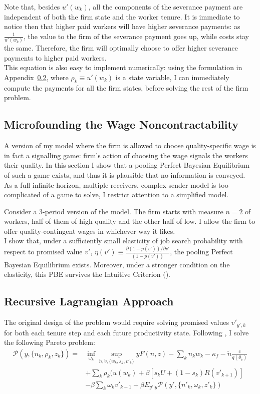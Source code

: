 Note that, besides $u'(w_k)$, all the components of the severance payment are independent of both the firm state and the worker tenure. 
It is immediate to notice then that higher paid workers will have higher severance payments: as $\frac{1}{u'(w_k)}$, the value to the firm of the severance payment goes up, while costs stay the same. Therefore, the firm will optimally choose to offer higher severance payments to higher paid workers. \\
This equation is also easy to implement numerically: using the formulation in Appendix~\ref{dual}, where $\rho_k\equiv u'(w_k)$ is a state variable, I can immediately compute the payments for all the firm states, before solving the rest of the firm problem.
\subsection{Microfounding the Wage Noncontractability} \label{microfoundation}
A version of my model where the firm is allowed to choose quality-specific wage is in fact a signalling game: firm's action of choosing the wage signals the workers their quality. In this section I show that a pooling Perfect Bayesian Equilibrium of such a game exists, and thus it is plausible that no information is conveyed. \\
As a full infinite-horizon, multiple-receivers, complex sender model is too complicated of a game to solve, I restrict attention to a simplified model. 

Consider a 3-period version of the model. The firm starts with measure $n=2$ of workers, half of them of high quality and the other half of low. I allow the firm to offer quality-contingent wages in whichever way it likes. \\
I show that, under a sufficiently small elasticity of job search probability with respect to promised value $v'$, $\eta(v')\equiv\frac{\partial (1-p(v')) /\partial v'}{(1-p(v'))}$, the pooling Perfect Bayesian Equilibrium exists. Moreover, under a stronger condition on the elasticity, this PBE survives the Intuitive Criterion (\textcite{Cho1987}).

\subsection{Recursive Lagrangian Approach} \label{dual}
The original design of the problem would require solving promised values $v'_{y',k}$ for both each tenure step and each future productivity state. Following \textcite{balke2022}, I solve the following Pareto problem:
\begin{equation*}
\begin{split}
\mathcal{P}(y,\{n_k,\rho_k,z_k\}) = &\inf_{\omega_k} \sup_{\tilde{n},\tilde{v},\{w_k,s_k,v'_k\}}  yF(n,z) - \sum_k n_kw_k - \kappa_f - \tilde{n}\frac{c}{q(\theta_{\tilde{v}})}   \\
& + \sum_k\rho_k(u(w_k)+\beta[s_kU+(1-s_k)R(v'_{k+1})] \\
& -\beta\sum_k \omega_k v'_{k+1}+\beta E_{y'|y}\mathcal{P}(y',\{n'_k,\omega_k,z'_k\})    
\end{split}
\end{equation*}

